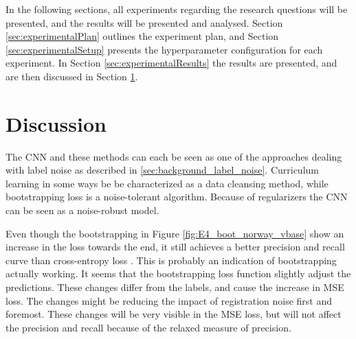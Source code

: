 \documentclass[a4paper]{book}
\begin{document}
In the following sections, all experiments regarding the research questions will be presented, and the results will be presented and analysed. Section \ref{sec:experimentalPlan} outlines the experiment plan, and Section \ref{sec:experimentalSetup} presents the hyperparameter configuration for each experiment. In Section \ref{sec:experimentalResults} the results are presented, and are then discussed in Section \ref{sec:Discussion}.
\label{cha:ResearchAndResults}







\section{Discussion}
\label{sec:Discussion}
The \ac{CNN} and these methods can each be seen as one of the approaches dealing with label noise as described in \ref{sec:background_label_noise}. Curriculum learning in some ways be be characterized as a data cleansing method, while bootstrapping loss is a noise-tolerant algorithm. Because of regularizers the \ac{CNN} can be seen as a noise-robust model. 

Even though the bootstrapping in Figure \ref{fig:E4_boot_norway_vbase} show an increase in the loss towards the end, it still achieves a better precision and recall curve than cross-entropy loss . This is probably an indication of bootstrapping actually working. It seems that the bootstrapping loss function slightly adjust the predictions. These changes differ from the labels, and cause the increase in MSE loss. The changes might be reducing the impact of registration noise first and foremost. These changes will be very visible in the MSE loss, but will not affect the precision and recall because of the relaxed measure of precision. \\
\end{document}
